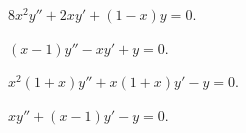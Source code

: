 \documentclass[a4paper,12pt, leqno, answers]{exam}
\begin{document}
\begin{questions}
\begin{solution}
    \end{solution}

    \question $8 x^2 y'' + 2 x y' + \left( 1 - x \right) y = 0$.
    \begin{solution}
        
    \end{solution}

    \question $\left( x - 1 \right) y'' - x y' + y = 0$.
    \begin{solution}
        
    \end{solution}

    \question $x^2 \left( 1 + x \right) y'' + x \left( 1 + x \right) y' - y = 0$.
    \begin{solution}
        
    \end{solution}

    \question $x y'' + \left( x - 1 \right) y' - y = 0$.
    \begin{solution}
        
    \end{solution}
\end{questions}
\end{document}
